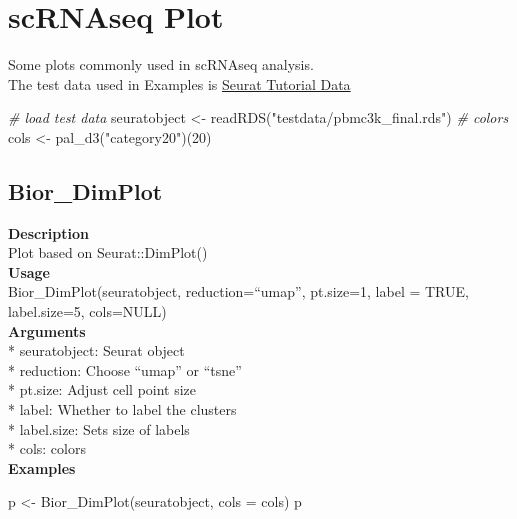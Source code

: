 \documentclass[
]{book}
\newenvironment{Shaded}{\begin{snugshade}}{\end{snugshade}}
\newcommand{\AttributeTok}[1]{\textcolor[rgb]{0.77,0.63,0.00}{#1}}
\newcommand{\CommentTok}[1]{\textcolor[rgb]{0.56,0.35,0.01}{\textit{#1}}}
\newcommand{\DecValTok}[1]{\textcolor[rgb]{0.00,0.00,0.81}{#1}}
\newcommand{\FunctionTok}[1]{\textcolor[rgb]{0.00,0.00,0.00}{#1}}
\newcommand{\NormalTok}[1]{#1}
\newcommand{\OtherTok}[1]{\textcolor[rgb]{0.56,0.35,0.01}{#1}}
\newcommand{\StringTok}[1]{\textcolor[rgb]{0.31,0.60,0.02}{#1}}
\begin{document}
\hypertarget{scrnaseq-plot}{%
\chapter{scRNAseq Plot}\label{scrnaseq-plot}}

Some plots commonly used in scRNAseq analysis.\\
The test data used in Examples is \href{https://satijalab.org/seurat/archive/v3.1/pbmc3k_tutorial.html}{Seurat Tutorial Data}\\

\begin{Shaded}
\begin{Highlighting}[]
\CommentTok{\# load test data}
\NormalTok{seuratobject }\OtherTok{\textless{}{-}} \FunctionTok{readRDS}\NormalTok{(}\StringTok{"testdata/pbmc3k\_final.rds"}\NormalTok{)}
\CommentTok{\# colors}
\NormalTok{cols }\OtherTok{\textless{}{-}} \FunctionTok{pal\_d3}\NormalTok{(}\StringTok{"category20"}\NormalTok{)(}\DecValTok{20}\NormalTok{)}
\end{Highlighting}
\end{Shaded}

\hypertarget{bior_dimplot}{%
\section{Bior\_DimPlot}\label{bior_dimplot}}

\textbf{Description}\\
Plot based on Seurat::DimPlot()\\
\textbf{Usage}\\
Bior\_DimPlot(seuratobject, reduction=``umap'', pt.size=1, label = TRUE, label.size=5, cols=NULL)\\
\textbf{Arguments}\\
* seuratobject: Seurat object\\
* reduction: Choose ``umap'' or ``tsne''\\
* pt.size: Adjust cell point size\\
* label: Whether to label the clusters\\
* label.size: Sets size of labels\\
* cols: colors\\
\textbf{Examples}

\begin{Shaded}
\begin{Highlighting}[]
\NormalTok{p }\OtherTok{\textless{}{-}} \FunctionTok{Bior\_DimPlot}\NormalTok{(seuratobject, }\AttributeTok{cols =}\NormalTok{ cols)}
\NormalTok{p}
\end{Highlighting}
\end{Shaded}
\end{document}
